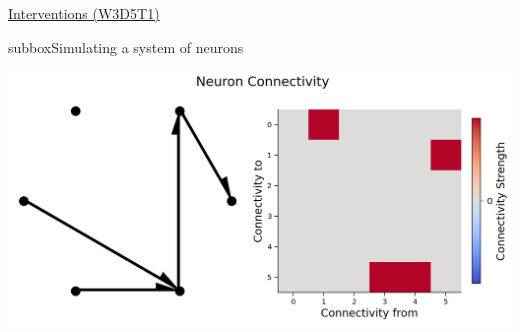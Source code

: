 \begin{textbox}{\href{https://compneuro.neuromatch.io/tutorials/W3D5_NetworkCausality/student/W3D5_Tutorial1.html}{Interventions (W3D5T1)}   }
\begin{subbox}{subbox}{Simulating a system of neurons}
\begin{center}
\includegraphics[scale=0.25]{Figures/NC/NC_Figure1.png}
\end{center}
\end{subbox}
\end{textbox}
